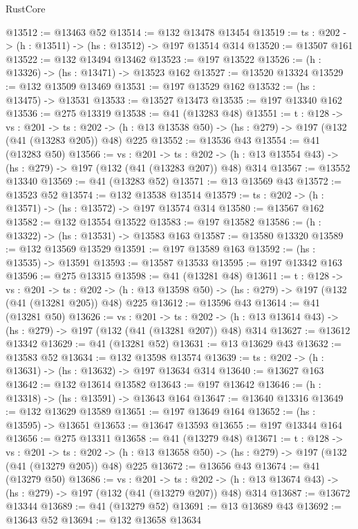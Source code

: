 \begin{lexlean}{RustCore}
\begin{coremodule}
@13512 := @13463 @52
@13514 := @132 @13478 @13454
@13519 := {ts : @202} -> (h : @13511) -> (hs : @13512) -> @197 @13514 @314
@13520 := @13507 @161
@13522 := @132 @13494 @13462
@13523 := @197 @13522
@13526 := (h : @13326) -> (hs : @13471) -> @13523 @162
@13527 := @13520 @13324
@13529 := @132 @13509 @13469
@13531 := @197 @13529 @162
@13532 := (hs : @13475) -> @13531
@13533 := @13527 @13473
@13535 := @197 @13340 @162
@13536 := @275 @13319
@13538 := @41 (@13283 @48)
@13551 := {t : @128} ->
  {vs : @201} ->
  {ts : @202} -> (h : @13 @13538 @50) -> (hs : @279) -> @197 (@132 (@41 (@13283 @205)) @48) @225
@13552 := @13536 @43
@13554 := @41 (@13283 @50)
@13566 := {vs : @201} ->
  {ts : @202} -> (h : @13 @13554 @43) -> (hs : @279) -> @197 (@132 (@41 (@13283 @207)) @48) @314
@13567 := @13552 @13340
@13569 := @41 (@13283 @52)
@13571 := @13 @13569 @43
@13572 := @13523 @52
@13574 := @132 @13538 @13514
@13579 := {ts : @202} -> (h : @13571) -> (hs : @13572) -> @197 @13574 @314
@13580 := @13567 @162
@13582 := @132 @13554 @13522
@13583 := @197 @13582
@13586 := (h : @13322) -> (hs : @13531) -> @13583 @163
@13587 := @13580 @13320
@13589 := @132 @13569 @13529
@13591 := @197 @13589 @163
@13592 := (hs : @13535) -> @13591
@13593 := @13587 @13533
@13595 := @197 @13342 @163
@13596 := @275 @13315
@13598 := @41 (@13281 @48)
@13611 := {t : @128} ->
  {vs : @201} ->
  {ts : @202} -> (h : @13 @13598 @50) -> (hs : @279) -> @197 (@132 (@41 (@13281 @205)) @48) @225
@13612 := @13596 @43
@13614 := @41 (@13281 @50)
@13626 := {vs : @201} ->
  {ts : @202} -> (h : @13 @13614 @43) -> (hs : @279) -> @197 (@132 (@41 (@13281 @207)) @48) @314
@13627 := @13612 @13342
@13629 := @41 (@13281 @52)
@13631 := @13 @13629 @43
@13632 := @13583 @52
@13634 := @132 @13598 @13574
@13639 := {ts : @202} -> (h : @13631) -> (hs : @13632) -> @197 @13634 @314
@13640 := @13627 @163
@13642 := @132 @13614 @13582
@13643 := @197 @13642
@13646 := (h : @13318) -> (hs : @13591) -> @13643 @164
@13647 := @13640 @13316
@13649 := @132 @13629 @13589
@13651 := @197 @13649 @164
@13652 := (hs : @13595) -> @13651
@13653 := @13647 @13593
@13655 := @197 @13344 @164
@13656 := @275 @13311
@13658 := @41 (@13279 @48)
@13671 := {t : @128} ->
  {vs : @201} ->
  {ts : @202} -> (h : @13 @13658 @50) -> (hs : @279) -> @197 (@132 (@41 (@13279 @205)) @48) @225
@13672 := @13656 @43
@13674 := @41 (@13279 @50)
@13686 := {vs : @201} ->
  {ts : @202} -> (h : @13 @13674 @43) -> (hs : @279) -> @197 (@132 (@41 (@13279 @207)) @48) @314
@13687 := @13672 @13344
@13689 := @41 (@13279 @52)
@13691 := @13 @13689 @43
@13692 := @13643 @52
@13694 := @132 @13658 @13634

\end{coremodule}
\end{lexlean}
